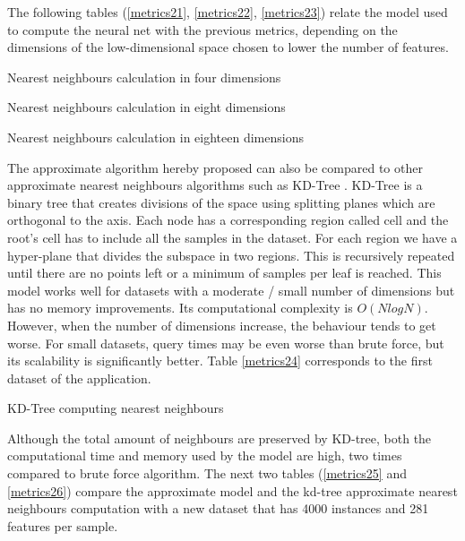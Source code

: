 \documentclass[a4paper,11pt,spanish]{report}
\begin{document}
The following tables (\ref{metrics21}, \ref{metrics22}, \ref{metrics23}) relate the model used to compute the neural net with the previous metrics, depending on the dimensions of the low-dimensional space chosen to lower the number of features.

\begin{table}[h]
\centering

\caption{\label{metrics21}Nearest neighbours calculation in four dimensions}
\end{table}

\begin{table}[h]
\centering

\caption{\label{metrics22}Nearest neighbours calculation in eight dimensions}
\end{table}

\begin{table}[h]
\centering

\caption{\label{metrics23}Nearest neighbours calculation in eighteen dimensions}
\end{table}

The approximate algorithm hereby proposed can also be compared to other approximate nearest neighbours algorithms such as KD-Tree \citep{kdtree}. KD-Tree is a binary tree that creates divisions of the space using splitting planes which are orthogonal to the axis. Each node has a corresponding region called cell and the root's cell has to include all the samples in the dataset. For each region we have a hyper-plane that divides the subspace in two regions. This is recursively repeated until there are no points left or a minimum of samples per leaf is reached. This model works well for datasets with a moderate / small number of dimensions but has no memory improvements. Its computational complexity is  $O(NlogN)$. However, when the number of dimensions increase, the behaviour tends to get worse. For small datasets, query times may be even worse than brute force, but its scalability is significantly better. Table \ref{metrics24} corresponds to the first dataset of the application.

\begin{table}[h]
\centering

\caption{\label{metrics24}KD-Tree computing nearest neighbours}
\end{table}

Although the total amount of neighbours are preserved by KD-tree, both the computational time and memory used by the model are high, two times compared to brute force algorithm. The next two tables (\ref{metrics25} and \ref{metrics26}) compare the approximate model and the kd-tree approximate nearest neighbours computation with a new dataset that has 4000 instances and 281 features per sample.
\end{document}
